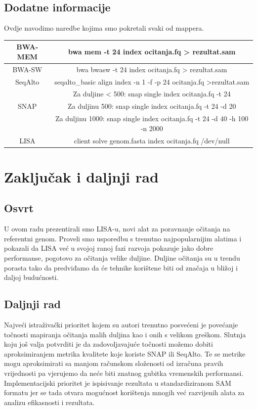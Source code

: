 \documentclass[times, utf8, diplomski]{fer}
\begin{document}
\section {Dodatne informacije}
Ovdje navodimo naredbe kojima smo pokretali svaki od mappera.

\begin{table}[H]
\centering
\begin{tabular}{|c|c|}
\hline
BWA-MEM & bwa mem -t 24 index ocitanja.fq > rezultat.sam\\
\hline
BWA-SW & bwa bwasw -t 24 index ocitanja.fq > rezultat.sam\\
\hline
SeqAlto & seqalto\_basic align index -n 1 -f -p 24 ocitanja.fq >rezultat.sam\\
\hline
 & Za duljine < 500: snap single index ocitanja.fq -t 24\\
SNAP & Za duljinu 500: snap single index ocitanja.fq -t 24 -d 20\\
& Za duljinu 1000: snap single index ocitanja.fq -t 24 -d 40 -h 100 -n 2000\\
\hline
LISA & client solve genom.fasta index ocitanja.fq /dev/null\\
\hline
\end{tabular}
\label{komande}
\end{table}


\chapter{Zaključak i daljnji rad}

\section{Osvrt}
U ovom radu prezentirali smo LISA-u, novi alat za poravnanje očitanja na referentni genom. Proveli smo usporedbu s trenutno najpopularnijim alatima i pokazali da LISA već u svojoj ranoj fazi razvoja pokazuje jako dobre performanse, pogotovo za očitanja velike duljine. Duljine očitanja su u trendu porasta tako da predviđamo da će tehnike korištene biti od značaja u bližoj i daljoj budućnosti.

\section{Daljnji rad}
Najveći istraživački prioritet kojem su autori trenutno posvećeni je povećanje točnosti mapiranja očitanja malih duljina kao i onih s velikom greškom. Slutnja koju još valja potvrditi je da zadovoljavajuće točnosti možemo dobiti aproksimiranjem metrika kvalitete koje koriste SNAP ili SeqAlto. Te se metrike mogu aproksimirati sa manjom računskom složenosti od izračuna pravih vrijednosti pa vjerujemo da neće biti znatnog gubitka vremenskih performansi.\\
Implementacijski prioritet je ispisivanje rezultata u standardiziranom SAM formatu jer se tada otvara mogućnost korištenja mnogih već razvijenih alata za analizu efikasnosti i rezultata.
\end{document}
